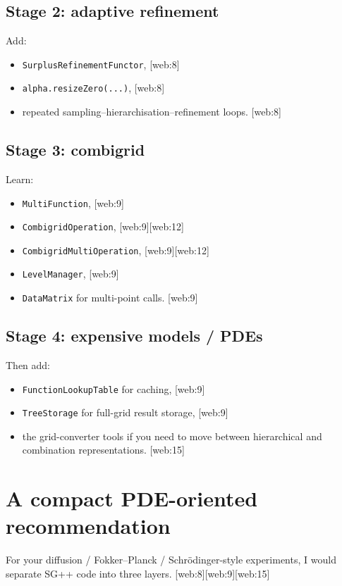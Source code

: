 \documentclass[11pt,a4paper]{article}
\begin{document}
\subsection*{Stage 2: adaptive refinement}
Add:
\begin{itemize}[leftmargin=1.5em]
\item \texttt{SurplusRefinementFunctor}, [web:8]
\item \texttt{alpha.resizeZero(...)}, [web:8]
\item repeated sampling--hierarchisation--refinement loops. [web:8]
\end{itemize}

\subsection*{Stage 3: combigrid}
Learn:
\begin{itemize}[leftmargin=1.5em]
\item \texttt{MultiFunction}, [web:9]
\item \texttt{CombigridOperation}, [web:9][web:12]
\item \texttt{CombigridMultiOperation}, [web:9][web:12]
\item \texttt{LevelManager}, [web:9]
\item \texttt{DataMatrix} for multi-point calls. [web:9]
\end{itemize}

\subsection*{Stage 4: expensive models / PDEs}
Then add:
\begin{itemize}[leftmargin=1.5em]
\item \texttt{FunctionLookupTable} for caching, [web:9]
\item \texttt{TreeStorage} for full-grid result storage, [web:9]
\item the grid-converter tools if you need to move between hierarchical and combination representations. [web:15]
\end{itemize}

\section{A compact PDE-oriented recommendation}

For your diffusion / Fokker--Planck / Schr\"odinger-style experiments, I would separate SG++ code into three layers. [web:8][web:9][web:15]
\end{document}
